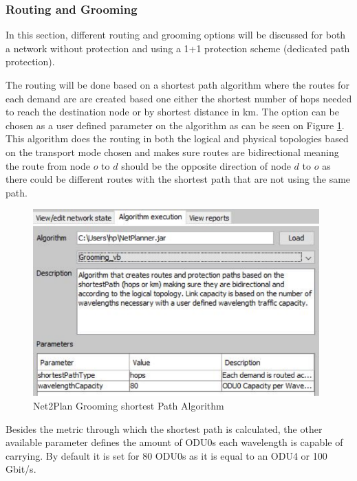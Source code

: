 	\subsubsection{Routing and Grooming} \label{Routing and Grooming}
	
	\vspace{1cm}
	In this section, different routing and grooming options will be discussed for both a network without protection and using a 1+1 protection scheme (dedicated path protection).
		
	The routing will be done based on a shortest path algorithm where the routes for each demand are are created based one either the shortest number of hops needed to reach the destination node or by shortest distance in km. The option can be chosen as a user defined parameter on the algorithm as can be seen on Figure \ref{Grooming_Algorithm}. This algorithm does the routing in both the logical and physical topologies based on the transport mode chosen and makes sure routes are bidirectional meaning the route from node $o$ to $d$ should be the opposite direction of node $d$ to $o$ as there could be different routes with the shortest path that are not using the same path.
	
	\vspace{0.5cm}
	\begin{figure}[h!]
		\centering
		\includegraphics[width = 11cm]{Grooming_Algorithm.pdf}
		\caption{Net2Plan Grooming shortest Path Algorithm}
		\label{Grooming_Algorithm}
	\end{figure}	
	
	Besides the metric through which the shortest path is calculated, the other available parameter defines the amount of ODU0s each wavelength is capable of carrying. By default it is set for 80 ODU0s as it is equal to an ODU4 or 100 Gbit/s.\\

